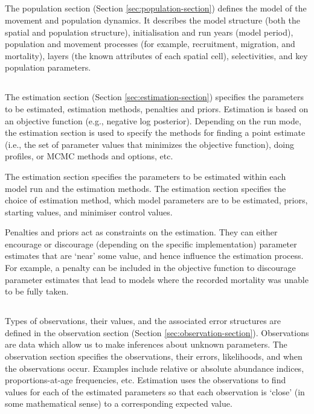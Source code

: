 \subsection{}

The population section (Section \ref{sec:population-section}) defines the model of the movement and population dynamics. It describes the model structure (both the spatial and population structure), initialisation and run years (model period), population and movement processes (for example, recruitment, migration, and mortality), layers (the known attributes of each spatial cell), selectivities, and key population parameters.

\subsection{}

The estimation section (Section \ref{sec:estimation-section}) specifies the parameters to be estimated, estimation methods, penalties and priors. Estimation is based on an objective function (e.g., negative log posterior). Depending on the run mode, the estimation section is used to specify the methods for finding a point estimate (i.e., the set of parameter values that minimizes the objective function), doing profiles, or MCMC methods and options, etc.

The estimation section specifies the parameters to be estimated within each model run and the estimation methods. The estimation section specifies the choice of estimation method, which model parameters are to be estimated, priors, starting values, and minimiser control values.

Penalties and priors act as constraints on the estimation. They can either encourage or discourage (depending on the specific implementation) parameter estimates that are `near' some value, and hence influence the estimation process. For example, a penalty can be included in the objective function to discourage parameter estimates that lead to models where the recorded mortality was unable to be fully taken.

\subsection{}

Types of observations, their values, and the associated error structures are defined in the observation section (Section \ref{sec:observation-section}). Observations are data which allow us to make inferences about unknown parameters. The observation section specifies the observations, their errors, likelihoods, and when the observations occur. Examples include relative or absolute abundance indices, proportions-at-age frequencies, etc. Estimation uses the observations to find values for each of the estimated parameters so that each observation is `close' (in some mathematical sense) to a corresponding expected value. 

